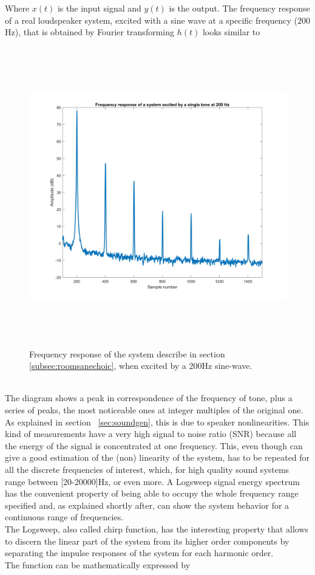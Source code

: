 Where $x(t)$ is the input signal and $y(t)$ is the output. The frequency response of a real loudspeaker system, excited with a sine wave at a specific frequency ($200$Hz), that is obtained by Fourier transforming $h(t)$ looks similar to 
\begin{figure}[th]
\centering
\includegraphics[width=13cm,height=13cm,keepaspectratio]{Figures/frsingletoneanechoic}
\decoRule
\caption[FR single tone]{Frequency response of the system describe in section \ref{subsec:roomsanechoic}, when excited by a $200$Hz sine-wave.}
\label{fig:frsingletone}
\end{figure}
\\
The diagram shows a peak in correspondence of the frequency of tone, plus a series of peaks, the most noticeable ones at integer multiples of the original one. As explained in section ~\ref{sec:soundgen}, this is due to speaker nonlinearities. This kind of measurements have a very high
signal to noise ratio (SNR) because all the energy of the signal is concentrated at one frequency. This, even though can give a good estimation of the (non) linearity of the system, has to be repeated for all the discrete frequencies of interest, which, for high quality sound systems range between [20-20000]Hz, or even more. A Logsweep signal energy spectrum has the convenient property of being able to occupy the whole frequency range specified and, as explained shortly after, can show the system behavior for a continuous range of frequencies.
\\
The Logsweep, also called chirp function, has the interesting property that allows to discern the linear part of the system from its higher order components by separating the impulse responses of the system for each harmonic order.
\\
The function can be mathematically expressed by

